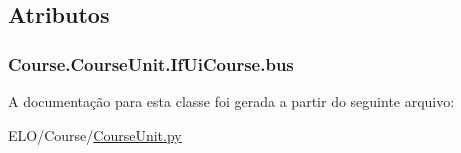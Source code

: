 \subsection{Atributos}
\hypertarget{classCourse_1_1CourseUnit_1_1IfUiCourse_a228fc709b99da3a7e6f5020bd07cee03}{
\subsubsection[{bus}]{\setlength{\rightskip}{0pt plus 5cm}Course.\-Course\-Unit.\-If\-Ui\-Course.\-bus}}\label{d6/d82/classCourse_1_1CourseUnit_1_1IfUiCourse_a228fc709b99da3a7e6f5020bd07cee03}


A documentação para esta classe foi gerada a partir do seguinte arquivo\-:\begin{DoxyCompactItemize}
\item 
E\-L\-O/\-Course/\hyperlink{CourseUnit_8py}{Course\-Unit.\-py}\end{DoxyCompactItemize}
